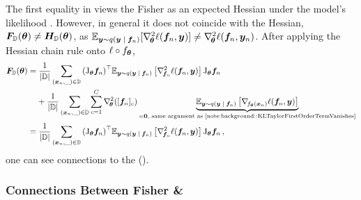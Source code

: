 The first equality in
 views the Fisher as
an expected Hessian under the model's likelihood%
. However, in general it does not coincide with the Hessian, ${\bm{F}}_{{\mathbb{D}}}({\bm{\theta}})
\neq {\bm{H}}_{{\mathbb{D}}}({\bm{\theta}})$, as $ \mathbb{E}_{{\bm{y}} \sim q({\bm{y}}\;|\;{\bm{f}}_n)}
[\nabla_{\!{{\bm{\theta}}}}^{2} \ell({\bm{f}}_n, {\bm{y}}) ] \neq \nabla_{\!{{\bm{\theta}}}}^{2} \ell({\bm{f}}_n,
{\bm{y}}_n)$. After applying the Hessian chain rule 
onto $\ell \circ f_{{\bm{\theta}}}$,
\begin{align}
  \label{eq:background::FisherGGNPerspective}
  \begin{split}
    \mF_{\sD}(\vtheta)
    &=
      \frac{1}{|\sD|}
      \sum_{(\vx_n, \_) \in \sD}
      {(\jac_{\vtheta}\vf_n)}^{\top}
      \E_{\vy \sim q(\giventhat{\vy}{\vf_n})}
      \left[
      \gradsquared{\vf_n}\ell(\vf_n, \vy)
      \right]
      {\jac_{\vtheta}\vf_n}
    \\
    &\phantom{=} \
      +
      \frac{1}{|\sD|}
      \sum_{(\vx_n, \_) \in \sD}
      \sum_{c=1}^{C}
      \gradsquared{\vtheta}{([\vf_n]_{c})}
      \underbrace{
      \E_{\vy \sim q(\giventhat{\vy}{\vf_n})}
      \left[
      \grad{f_{\vtheta}(\vx_{n})} \ell(\vf_n, \vy)
      \right]
      }_{
      = \vzero\text{, same argument as \Cref{note:background::KLTaylorFirstOrderTermVanishes}}
      }
    \\
    &=
      \frac{1}{|\sD|}
      \sum_{(\vx_n, \_) \in \sD}
      {(\jac_{\vtheta}\vf_n)}^{\top}
      \E_{\vy \sim q(\giventhat{\vy}{\vf_n})}
      \left[
      \gradsquared{\vf_n}\ell(\vf_n, \vy)
      \right]
      {\jac_{\vtheta}\vf_n}\,,
  \end{split}
\end{align}
one can see connections to the \ggn
().

\subsubsection{Connections Between Fisher \& \ggn}

